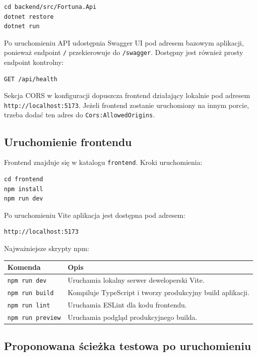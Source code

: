 \documentclass[12pt,a4paper]{article}
\begin{document}
\begin{verbatim}
cd backend/src/Fortuna.Api
dotnet restore
dotnet run
\end{verbatim}

Po uruchomieniu API udostępnia Swagger UI pod adresem bazowym aplikacji, ponieważ endpoint \texttt{/} przekierowuje do \texttt{/swagger}. Dostępny jest również prosty endpoint kontrolny:

\begin{verbatim}
GET /api/health
\end{verbatim}

Sekcja CORS w konfiguracji dopuszcza frontend działający lokalnie pod adresem \texttt{http://localhost:5173}. Jeżeli frontend zostanie uruchomiony na innym porcie, trzeba dodać ten adres do \texttt{Cors:AllowedOrigins}.

\subsection{Uruchomienie frontendu}

Frontend znajduje się w katalogu \texttt{frontend}. Kroki uruchomienia:

\begin{verbatim}
cd frontend
npm install
npm run dev
\end{verbatim}

Po uruchomieniu Vite aplikacja jest dostępna pod adresem:

\begin{verbatim}
http://localhost:5173
\end{verbatim}

Najważniejsze skrypty npm:

\begin{longtable}{p{}p{}}
\toprule
\textbf{Komenda} & \textbf{Opis} \\
\midrule
\endhead
\texttt{npm run dev} & Uruchamia lokalny serwer deweloperski Vite. \\
\texttt{npm run build} & Kompiluje TypeScript i tworzy produkcyjny build aplikacji. \\
\texttt{npm run lint} & Uruchamia ESLint dla kodu frontendu. \\
\texttt{npm run preview} & Uruchamia podgląd produkcyjnego builda. \\
\bottomrule
\end{longtable}

\subsection{Proponowana ścieżka testowa po uruchomieniu}
\end{document}
